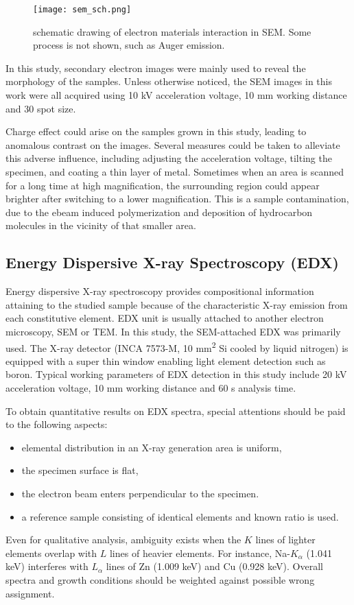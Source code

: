 \begin{figure}[htb]
\centering
\texttt{[image: sem\_sch.png]}
\caption[SEM excitation volume]{schematic drawing of electron materials interaction in SEM. Some process is not shown, such as Auger emission.}
\label{fig:ch2sem}
\end{figure}

In this study, secondary electron images were mainly used to reveal the morphology of the samples. Unless otherwise noticed, the SEM images in this work were all acquired using 10 kV acceleration voltage, 10 mm working distance and 30 spot size.

Charge effect could arise on the samples grown in this study, leading to anomalous contrast on the images. Several measures could be taken to alleviate this adverse influence, including adjusting the acceleration voltage, tilting the specimen, and coating a thin layer of metal. Sometimes when an area is scanned for a long time at high magnification, the surrounding region could appear brighter after switching to a lower magnification. This is a sample contamination, due to the \gls{ebeam} induced polymerization and deposition of hydrocarbon molecules in the vicinity of that smaller area. 


\subsection{Energy Dispersive X-ray Spectroscopy (EDX)}\label{sec:edx}

Energy dispersive X-ray spectroscopy provides compositional information attaining to the studied sample because of the characteristic X-ray emission from each constitutive element. EDX unit is usually attached to another electron microscopy, SEM or TEM. In this study, the SEM-attached EDX was primarily used. The X-ray detector (INCA 7573-M, 10 \si{mm^2} Si cooled by liquid nitrogen) is equipped with a super thin window enabling light element detection such as boron. Typical working parameters of EDX detection in this study include 20 kV acceleration voltage, 10 mm working distance and 60 s analysis time.

To obtain quantitative results on EDX spectra, special attentions should be paid to the following aspects:
\begin{itemize}
\item elemental distribution in an X-ray generation area is uniform,
\item the specimen surface is flat,
\item the electron beam enters perpendicular to the specimen. 
\item a reference sample consisting of identical elements and known ratio is used. 
\end{itemize}
Even for qualitative analysis, ambiguity exists when the $K$ lines of lighter elements overlap with $L$ lines of heavier elements. For instance, Na-$K_\alpha$ (1.041 keV) interferes with $L_\alpha$ lines of Zn (1.009 keV) and Cu (0.928 keV). Overall spectra and growth conditions should be weighted against possible wrong assignment. 

